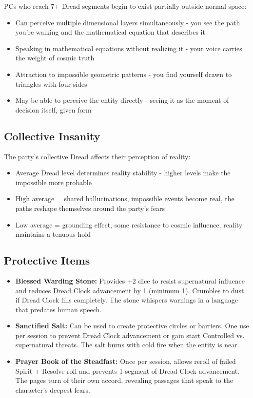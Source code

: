 \documentclass[11pt]{article}
\begin{document}
PCs who reach 7+ Dread segments begin to exist partially outside normal space:
\begin{itemize}
\item Can perceive multiple dimensional layers simultaneously - you see the path you're walking and the mathematical equation that describes it
\item Speaking in mathematical equations without realizing it - your voice carries the weight of cosmic truth
\item Attraction to impossible geometric patterns - you find yourself drawn to triangles with four sides
\item May be able to perceive the entity directly - seeing it as the moment of decision itself, given form
\end{itemize}

\subsection{Collective Insanity}

The party's collective Dread affects their perception of reality:
\begin{itemize}
\item Average Dread level determines reality stability - higher levels make the impossible more probable
\item High average = shared hallucinations, impossible events become real, the paths reshape themselves around the party's fears
\item Low average = grounding effect, some resistance to cosmic influence, reality maintains a tenuous hold
\end{itemize}

\subsection{Protective Items}

\begin{itemize}
\item \textbf{Blessed Warding Stone:} Provides +2 dice to resist supernatural influence and reduces Dread Clock advancement by 1 (minimum 1). Crumbles to dust if Dread Clock fills completely. The stone whispers warnings in a language that predates human speech.
\item \textbf{Sanctified Salt:} Can be used to create protective circles or barriers. One use per session to prevent Dread Clock advancement or gain start Controlled vs. supernatural threats. The salt burns with cold fire when the entity is near.
\item \textbf{Prayer Book of the Steadfast:} Once per session, allows reroll of failed Spirit + Resolve roll and prevents 1 segment of Dread Clock advancement. The pages turn of their own accord, revealing passages that speak to the character's deepest fears.
\end{itemize}
\end{document}
